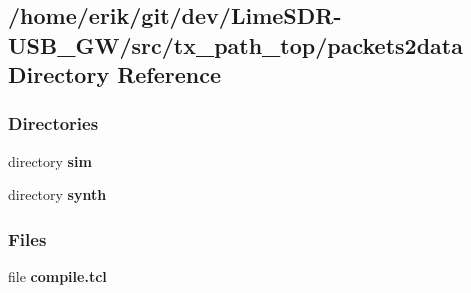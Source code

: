 \subsection{/home/erik/git/dev/\+Lime\+S\+D\+R-\/\+U\+S\+B\+\_\+\+G\+W/src/tx\+\_\+path\+\_\+top/packets2data Directory Reference}
\label{dir_fbde28c1ada75ddf513d086609b95587}
\subsubsection*{Directories}
\begin{DoxyCompactItemize}
\item 
directory {\bf sim}
\item 
directory {\bf synth}
\end{DoxyCompactItemize}
\subsubsection*{Files}
\begin{DoxyCompactItemize}
\item 
file {\bf compile.\+tcl}
\end{DoxyCompactItemize}
